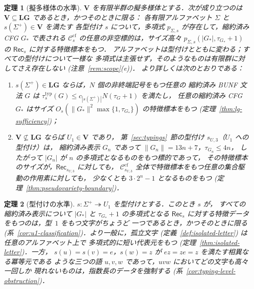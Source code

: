 \documentclass[11pt,a4paper]{ltjsarticle}
\numberwithin{equation}{section}
\theoremstyle{plain}
\theoremstyle{definition}
\theoremstyle{remark}
\theoremstyle{plain}
\newtheorem{mainthm}{定理}
\newcommand{\cf}{\mathrm{cf}}
\newcommand{\Ccf}[1]{\mathcal C_{#1}^{\cf}}
\newcommand{\Rec}{\mathsf{Rec}}
\newcommand{\LG}{\mathbf{LG}}
\begin{document}
\begin{mainthm}[擬多様体の水準]
\label{thm:A}
$\mathbf V$ を有限半群の擬多様体とする．次が成り立つのは
$\mathbf V\subseteq\LG$ であるとき，かつそのときに限る：
各有限アルファベット $\Sigma$ と $s(\Sigma^+)\in\mathbf V$ を満たす
各型付け $s$ について，多項式 $p_{\Sigma,s}$ が存在して，縮約済み CFG
$G_*$ で表される $\Ccf{s}$ の任意の非空標的は，サイズ高々
$p_{\Sigma,s}(|G_*|,\tau_{G_*}+1)$ の $\Rec_s$ に対する特徴標本をもつ．
アルファベットは型付けとともに変わる；すべての型付けについて一様な
多項式は主張せず，そのようなものは有限群に対してさえ存在しない
\textup(注意~\ref{rem:scope}(e)\textup)．
より詳しくは次のとおりである：
\begin{enumerate}[label=\textup{(\roman*)},leftmargin=*]
\item $s(\Sigma^+)\in\LG$ ならば，$N$ 個の非終端記号をもつ任意の
縮約済み BUNF 文法 $G$ は
$\tau^{\mathrm{typ}}_s(G)\le c_{|s(\Sigma^+)|}N(\tau_G+1)$ を満たし，
任意の縮約済み CFG $G_*$ はサイズ
$O_s(\|G_*\|^2\max\{1,\tau_{G_*}\})$ の特徴標本をもつ
\textup(定理~\ref{thm:lg-sufficiency}\textup)；
\item $\mathbf V\not\subseteq\LG$ ならば $U_1\in\mathbf V$ であり，
第~\ref{sec:typings}~節の型付け $s_{U,3}$（$U_1$ への型付け）は，
縮約済み表示 $G_n$ であって $\|G_n\|=13n+7$，$\tau_{G_n}\le4n$，
したがって $|G_n|$ が $n$ の多項式となるものをもつ標的であって，
その特徴標本のサイズが，$\Rec_{s_{U,3}}$ に対しても，
$\Ccf{s_{U,3}}$ 全体で特徴標本をもつ任意の集合駆動の作用素に対しても，
少なくとも $3\cdot2^n-1$ となるものをもつ
\textup(定理~\ref{thm:pseudovariety-boundary}\textup)．
\end{enumerate}
\end{mainthm}

\begin{mainthm}[型付けの水準]
\label{thm:B}
$s:\Sigma^+\twoheadrightarrow U_1$ を型付けとする．このとき $s$ が，
すべての縮約済み表示について $|G_*|$ と $\tau_{G_*}+1$ の多項式となる
$\Rec_s$ に対する特徴データをもつのは，型~$1$ をもつ文字がちょうど
一つであるとき，かつそのときに限る
\textup(系~\ref{cor:u1-classification}\textup)．より一般に，孤立文字
\textup(定義~\ref{def:isolated-letter}\textup) は任意のアルファベット上で
多項式的に短い代表元をもつ
\textup(定理~\ref{thm:isolated-letter}\textup)．一方，
$s(u)=s(v)=e$，$s(w)=z$ が $ez=ze=z$ を満たす相異なる冪等元である
ような三つの語 $u,v,w$ であって，$uvw$ においてどの文字も高々一回しか
現れないものは，指数長のデータを強制する
\textup(系~\ref{cor:typing-level-obstruction}\textup)．
\end{mainthm}
\end{document}
